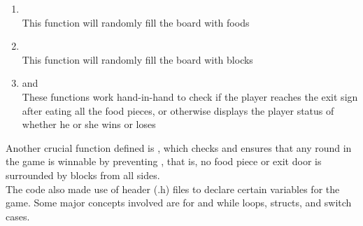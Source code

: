 \begin{enumerate}
    \item {}\\
    \hspace{1em} This function will randomly fill the board with foods
    \item {}\\
    \hspace{1em} This function will randomly fill the board with blocks
    \item {} and \\
    \hspace{1em} These functions work hand-in-hand to check if the player reaches the exit sign after eating all the food pieces,
    or otherwise displays the player status of whether he or she wins or loses
\end{enumerate}

Another crucial function defined is
, which checks and ensures that any
round in the game is winnable by preventing
, that is, no food piece or exit door
is surrounded by blocks from all sides.\\

The code also made use of header (.h) files to declare certain variables for
the game. Some major concepts involved are for and while loops, structs, and
switch cases.

